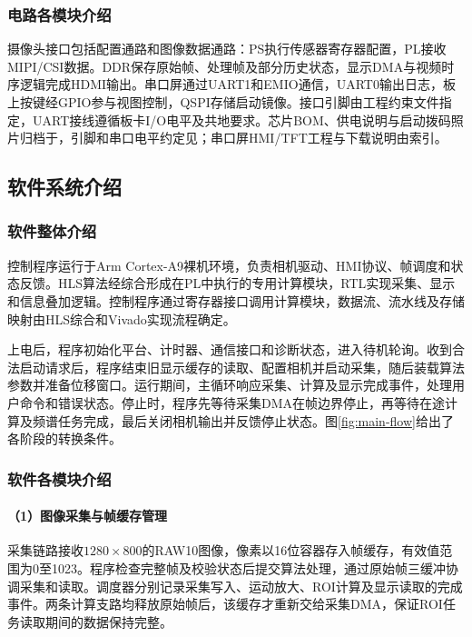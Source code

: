 \subsubsection{电路各模块介绍}
摄像头接口包括配置通路和图像数据通路：PS执行传感器寄存器配置，PL接收MIPI/CSI数据。DDR保存原始帧、处理帧及部分历史状态，显示DMA与视频时序逻辑完成HDMI输出。串口屏通过UART1和EMIO通信，UART0输出日志，板上按键经GPIO参与视图控制，QSPI存储启动镜像。接口引脚由工程约束文件指定，UART接线遵循板卡I/O电平及共地要求。芯片BOM、供电说明与启动拨码照片归档于，引脚和串口电平约定见；串口屏HMI/TFT工程与下载说明由索引。

\subsection{软件系统介绍}
\subsubsection{软件整体介绍}
控制程序运行于Arm Cortex-A9裸机环境，负责相机驱动、HMI协议、帧调度和状态反馈。HLS算法经综合形成在PL中执行的专用计算模块，RTL实现采集、显示和信息叠加逻辑。控制程序通过寄存器接口调用计算模块，数据流、流水线及存储映射由HLS综合和Vivado实现流程确定\cite{ug1399,ug901,ug904}。

上电后，程序初始化平台、计时器、通信接口和诊断状态，进入待机轮询。收到合法启动请求后，程序结束旧显示缓存的读取、配置相机并启动采集，随后装载算法参数并准备位移窗口。运行期间，主循环响应采集、计算及显示完成事件，处理用户命令和错误状态。停止时，程序先等待采集DMA在帧边界停止，再等待在途计算及频谱任务完成，最后关闭相机输出并反馈停止状态。图\ref{fig:main-flow}给出了各阶段的转换条件。


\subsubsection{软件各模块介绍}
\paragraph{（1）图像采集与帧缓存管理}
采集链路接收$1280\times800$的RAW10图像，像素以16位容器存入帧缓存，有效值范围为0至1023。程序检查完整帧及校验状态后提交算法处理，通过原始帧三缓冲协调采集和读取。调度器分别记录采集写入、运动放大、ROI计算及显示读取的完成事件。两条计算支路均释放原始帧后，该缓存才重新交给采集DMA，保证ROI任务读取期间的数据保持完整。

